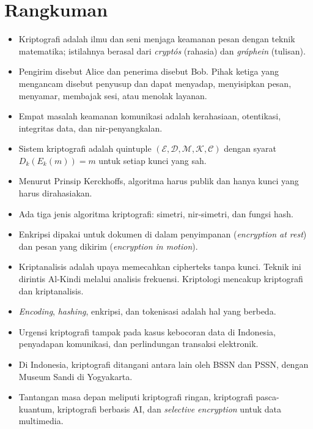 \section{Rangkuman}
\begin{itemize}
    \item Kriptografi adalah ilmu dan seni menjaga keamanan pesan dengan teknik
          matematika; istilahnya berasal dari \textit{crypt\'os} (rahasia) dan
          \textit{gr\'aphein} (tulisan).
    \item Pengirim disebut Alice dan penerima disebut Bob. Pihak ketiga yang
          mengancam disebut penyusup dan dapat menyadap, menyisipkan pesan,
          menyamar, membajak sesi, atau menolak layanan.
    \item Empat masalah keamanan komunikasi adalah kerahasiaan, otentikasi,
          integritas data, dan nir-penyangkalan.
    \item Sistem kriptografi adalah quintuple
          $(\mathcal{E},\mathcal{D},\mathcal{M},\mathcal{K},\mathcal{C})$
          dengan syarat $D_k(E_k(m)) = m$ untuk setiap kunci yang sah.
    \item Menurut Prinsip Kerckhoffs, algoritma harus publik dan hanya kunci
          yang harus dirahasiakan.
    \item Ada tiga jenis algoritma kriptografi: simetri, nir-simetri, dan fungsi
          hash.
    \item Enkripsi dipakai untuk dokumen di dalam penyimpanan
          (\textit{encryption at rest}) dan pesan yang dikirim
          (\textit{encryption in motion}).
    \item Kriptanalisis adalah upaya memecahkan cipherteks tanpa kunci. Teknik
          ini dirintis Al-Kindi melalui analisis frekuensi. Kriptologi mencakup
          kriptografi dan kriptanalisis.
    \item \textit{Encoding}, \textit{hashing}, enkripsi, dan tokenisasi adalah
          hal yang berbeda.
    \item Urgensi kriptografi tampak pada kasus kebocoran data di Indonesia,
          penyadapan komunikasi, dan perlindungan transaksi elektronik.
    \item Di Indonesia, kriptografi ditangani antara lain oleh BSSN dan PSSN,
          dengan Museum Sandi di Yogyakarta.
    \item Tantangan masa depan meliputi kriptografi ringan, kriptografi
          pasca-kuantum, kriptografi berbasis AI, dan \textit{selective
          encryption} untuk data multimedia.
\end{itemize}
